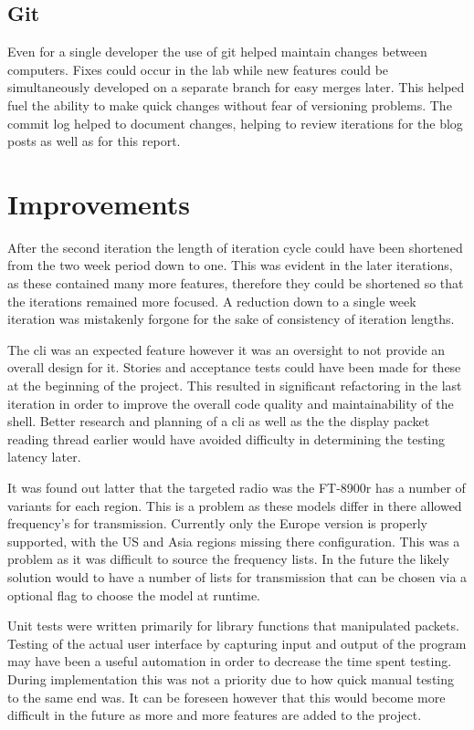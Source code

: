 \subsection*{Git}
Even for a single developer the use of git helped maintain changes between computers. Fixes could occur in the lab while new features could be simultaneously developed on a separate branch for easy merges later. This helped fuel the ability to make quick changes without fear of versioning problems. The commit log helped to document changes, helping to review iterations for the blog posts as well as for this report. 

\section{Improvements}

After the second iteration the length of iteration cycle could have been shortened from the two week period down to one. This was evident in the later iterations, as these contained many more features, therefore they could be shortened so that the iterations remained more focused. A reduction down to a single week iteration was mistakenly forgone for the sake of consistency of iteration lengths. 

The \gls{cli} was an expected feature however it was an oversight to not provide an overall design for it. Stories and acceptance tests could have been made for these at the beginning of the project. This resulted in significant refactoring in the last iteration in order to improve the overall code quality and maintainability of the shell. Better research and planning of a \gls{cli} as well as the the display packet reading thread earlier would have avoided difficulty in determining the testing latency later.

It was found out latter that the targeted radio was the FT-8900r has a number of variants for each region. This is a problem as these models differ in there allowed frequency's for transmission. Currently only the Europe version is properly supported, with the US and Asia regions missing there configuration. This was a problem as it was difficult to source the frequency lists. In the future the likely solution would to have a number of lists for transmission that can be chosen via a optional flag to choose the model at runtime.

Unit tests were written primarily for library functions that manipulated packets. Testing of the actual user interface by capturing input and output of the program may have been a useful automation in order to decrease the time spent testing. During implementation this was not a priority due to how quick manual testing to the same end was. It can be foreseen however that this would become more difficult in the future as more and more features are added to the project.


